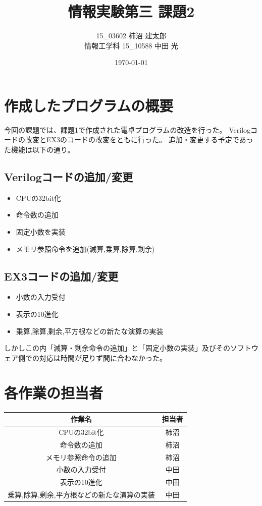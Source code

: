 \documentclass{jsarticle}
\title{情報実験第三 課題2}
\author{15\_03602 柿沼 建太郎 \\ 情報工学科 15\_10588 中田 光}
\date{\today}
\begin{document}
\maketitle

\section*{作成したプログラムの概要}
今回の課題では、課題1で作成された電卓プログラムの改造を行った。
Verilogコードの改変とEX3のコードの改変をともに行った。
追加・変更する予定であった機能は以下の通り。
\subsection*{Verilogコードの追加/変更}
\begin{itemize}
    \item CPUの32bit化
    \item 命令数の追加
    \item 固定小数を実装
    \item メモリ参照命令を追加(減算,乗算,除算,剰余)
\end{itemize}
\subsection*{EX3コードの追加/変更}
\begin{itemize}
    \item 小数の入力受付
    \item 表示の10進化
    \item 乗算,除算,剰余,平方根などの新たな演算の実装
\end{itemize}
しかしこの内「減算・剰余命令の追加」と「固定小数の実装」及びそのソフトウェア側での対応は時間が足りず間に合わなかった。

\section*{各作業の担当者}
\begin {table}[h]
    \begin {tabular}{|c|c|} \hline
        \rowcolor[rgb]{0.85, 1.0, 1.0} 作業名 & 担当者 \\ \hline
        CPUの32bit化 & 柿沼 \\ \hline
        命令数の追加 & 柿沼 \\ \hline
        メモリ参照命令の追加 & 柿沼 \\ \hline
        小数の入力受付 & 中田 \\ \hline
        表示の10進化 & 中田 \\ \hline
        乗算,除算,剰余,平方根などの新たな演算の実装 & 中田 \\ \hline
    \end {tabular}
\end {table}
\end{document}
